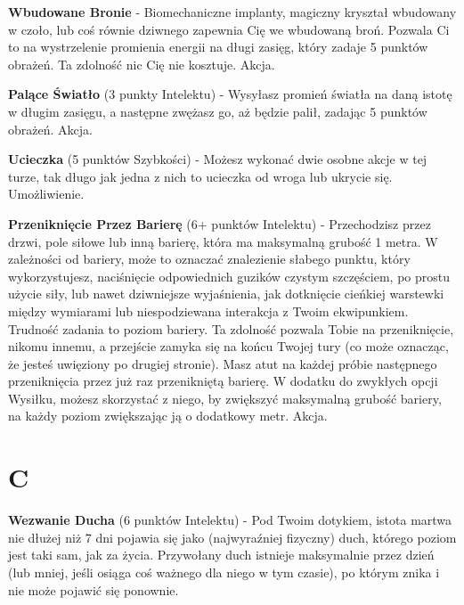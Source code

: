 \textbf{Wbudowane Bronie}\label{sec:Wbudowane Bronie} - Biomechaniczne implanty, magiczny kryształ wbudowany w czoło, lub coś równie dziwnego zapewnia Cię we wbudowaną broń. Pozwala Ci to na wystrzelenie promienia energii na długi zasięg, który zadaje 5 punktów obrażeń. Ta zdolność nic Cię nie kosztuje. Akcja.

\textbf{Palące Światło}\label{sec:Palące Światło} (3 punkty Intelektu) - Wysyłasz promień światła na daną istotę w długim zasięgu, a następne zwężasz go, aż będzie palił, zadając 5 punktów obrażeń. Akcja. 

\textbf{Ucieczka}\label{sec:Ucieczka} (5 punktów Szybkości) - Możesz wykonać dwie osobne akcje w tej turze, tak długo jak jedna z nich to ucieczka od wroga lub ukrycie się. Umożliwienie. 

\textbf{Przeniknięcie Przez Barierę}\label{sec:Przeniknięcie Przez Barierę} (6+ punktów Intelektu) - Przechodzisz przez drzwi, pole siłowe lub inną barierę, która ma maksymalną grubość 1 metra. W zależności od bariery, może to oznaczać znalezienie słabego punktu, który wykorzystujesz, naciśnięcie odpowiednich guzików czystym szczęściem, po prostu użycie siły, lub nawet dziwniejsze wyjaśnienia, jak dotknięcie cieńkiej warstewki między wymiarami lub niespodziewana interakcja z Twoim ekwipunkiem. Trudność zadania to poziom bariery. Ta zdolność pozwala Tobie na przeniknięcie, nikomu innemu, a przejście zamyka się na końcu Twojej tury (co może oznacząc, że jesteś uwięziony po drugiej stronie). Masz atut na każdej próbie następnego przeniknięcia przez już raz przenikniętą barierę. W dodatku do zwykłych opcji Wysiłku, możesz skorzystać z niego, by zwiększyć maksymalną grubość bariery, na każdy poziom zwiększając ją o dodatkowy metr. Akcja.

\section{C}

\textbf{Wezwanie Ducha}\label{sec:Wezwanie Ducha} (6 punktów Intelektu) - Pod Twoim dotykiem, istota martwa nie dłużej niż 7 dni pojawia się jako (najwyraźniej fizyczny) duch, którego poziom jest taki sam, jak za życia. Przywołany duch istnieje maksymalnie przez dzień (lub mniej, jeśli osiąga coś ważnego dla niego w tym czasie), po którym znika i nie może pojawić się ponownie. 

